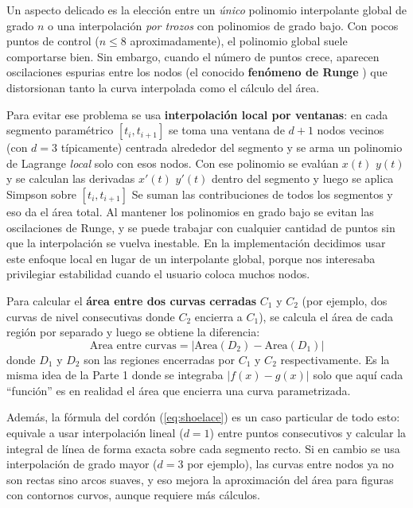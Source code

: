 \documentclass[12pt]{article}
\begin{document}
\begin{enumerate}
	Un aspecto delicado es la elección entre un \textit{único} polinomio interpolante global de grado $n$ o una interpolación \textit{por trozos} con polinomios de grado bajo. Con pocos puntos de control ($n \leq 8$ aproximadamente), el polinomio global suele comportarse bien. Sin embargo, cuando el número de puntos crece, aparecen oscilaciones espurias entre los nodos (el conocido \textbf{fenómeno de Runge} \cite{cheney08}) que distorsionan tanto la curva interpolada como el cálculo del área.

	Para evitar ese problema se usa \textbf{interpolación local por ventanas}: en cada segmento paramétrico $[t_i, t_{i+1}]$ se toma una ventana de $d+1$ nodos vecinos (con $d=3$ típicamente) centrada alrededor del segmento y se arma un polinomio de Lagrange \textit{local} solo con esos nodos. Con ese polinomio se evalúan $x(t)$ $y(t)$ y se calculan las derivadas $x'(t)$ $y'(t)$ dentro del segmento y luego se aplica Simpson sobre $[t_i, t_{i+1}]$ Se suman las contribuciones de todos los segmentos y eso da el área total. Al mantener los polinomios en grado bajo se evitan las oscilaciones de Runge, y se puede trabajar con cualquier cantidad de puntos sin que la interpolación se vuelva inestable. En la implementación decidimos usar este enfoque local en lugar de un interpolante global, porque nos interesaba privilegiar estabilidad cuando el usuario coloca muchos nodos.

	Para calcular el \textbf{área entre dos curvas cerradas} $C_1$ y $C_2$ (por ejemplo, dos curvas de nivel consecutivas donde $C_2$ encierra a $C_1$), se calcula el área de cada región por separado y luego se obtiene la diferencia:
	\[
	\text{Area entre curvas} = \bigl|\text{Area}(D_2) - \text{Area}(D_1)\bigr|
	\]
	donde $D_1$ y $D_2$ son las regiones encerradas por $C_1$ y $C_2$ respectivamente. Es la misma idea de la Parte 1 donde se integraba $|f(x) - g(x)|$ solo que aquí cada ``función'' es en realidad el área que encierra una curva parametrizada.

	Además, la fórmula del cordón (\ref{eq:shoelace}) es un caso particular de todo esto: equivale a usar interpolación lineal ($d=1$) entre puntos consecutivos y calcular la integral de línea de forma exacta sobre cada segmento recto. Si en cambio se usa interpolación de grado mayor ($d=3$ por ejemplo), las curvas entre nodos ya no son rectas sino arcos suaves, y eso mejora la aproximación del área para figuras con contornos curvos, aunque requiere más cálculos.
\end{enumerate}
\end{document}
